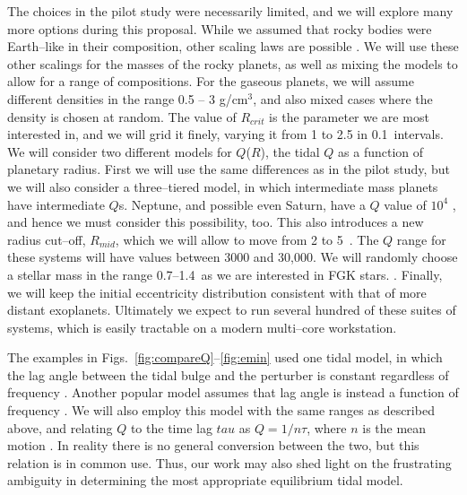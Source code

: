 The choices in the pilot study were necessarily limited, and we will
explore many more options during this proposal.  While we assumed that
rocky bodies were Earth--like in their composition, other scaling laws
are possible \citep[e.g.][]{Seager07,Fortney07,Lissauer11}.  We will
use these other scalings for the masses of the rocky planets, as well
as mixing the models to allow for a range of compositions.  For the
gaseous planets, we will assume different densities in the range 0.5
-- 3 g/cm$^3$, and also mixed cases where the density is chosen at
random.  The value of $R_{crit}$ is the parameter we are most
interested in, and we will grid it finely, varying it from 1 to 2.5
\rearth in 0.1~\rearth intervals.  We will consider two different
models for $Q$($R$), the tidal $Q$ as a function of planetary radius.
First we will use the same differences as in the pilot study, but we
will also consider a three--tiered model, in which intermediate mass
planets have intermediate $Q$s.  Neptune, and possible even Saturn,
have a $Q$ value of $10^4$ \citep{ZhangHamliton07,Lainey12}, and hence
we must consider this possibility, too.  This also introduces a new
radius cut--off, $R_{mid}$, which we will allow to move from 2 to
5~\rearth.  The $Q$ range for these systems will have values between
3000 and 30,000.  We will randomly choose a stellar mass in the range
0.7--1.4~\msun as we are interested in FGK stars.  . Finally, we will keep the initial eccentricity
distribution consistent with that of more distant exoplanets.
Ultimately we expect to run several hundred of these suites of
systems, which is easily tractable on a modern multi--core
workstation.

The examples in Figs.~\ref{fig:compareQ}--\ref{fig:emin} used one
tidal model, in which the lag angle between the tidal bulge and the
perturber is constant regardless of frequency
\citep[e.g.][]{GoldreichSoter66,Jackson08}.  Another popular model
assumes that lag angle is instead a function of frequency
\citep[e.g.][]{Hut81,Matsumura10}.  We will also employ this model
with the same ranges as described above, and relating $Q$ to the time
lag $tau$ as $Q = 1/n\tau$, where $n$ is the mean motion
\citep[e.g.][]{Correia12}.  In reality there is no general conversion between
the two, but this relation is in common use.  Thus, our work may also
shed light on the frustrating ambiguity in determining the most
appropriate equilibrium tidal model.

\medskip
{\centerline{}}
\smallskip

